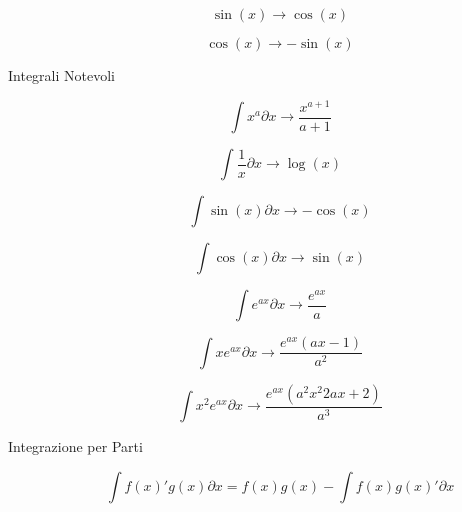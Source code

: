 \begin{description}
		\begin{equation}
		\sin(x) \rightarrow \cos(x)
		\end{equation}
		
		\begin{equation}
		\cos(x) \rightarrow -\sin(x)
		\end{equation}
	
	\item[Integrali Notevoli]
		\begin{equation}
		\int x^{a} \partial x \rightarrow \frac{x^{a+1}}{a+1}
		\end{equation}
		
		\begin{equation}
		\int \frac{1}{x} \partial x \rightarrow \log(x)
		\end{equation}
		
		\begin{equation}
		\int \sin(x) \partial x \rightarrow -\cos(x)
		\end{equation}
		
		\begin{equation}
		\int \cos(x) \partial x \rightarrow \sin(x)
		\end{equation}
		
		\begin{equation}
		\int e^{ax} \partial x \rightarrow \frac{e^{ax}}{a}
		\end{equation}
		
		\begin{equation}
		\int xe^{ax} \partial x \rightarrow \frac{e^{ax}(ax-1)}{a^{2}}
		\end{equation}
		
		\begin{equation}
		\int x^{2}e^{ax} \partial x \rightarrow \frac{e^{ax}(a^{2}x^{2}2ax+2)}{a^{3}}
		\end{equation}
	
	\item[Integrazione per Parti]
		\begin{equation}
		\int f(x)'g(x) \partial x = f(x)g(x) - \int f(x)g(x)' \partial x
		\end{equation}
	
\end{description}
\newpage

